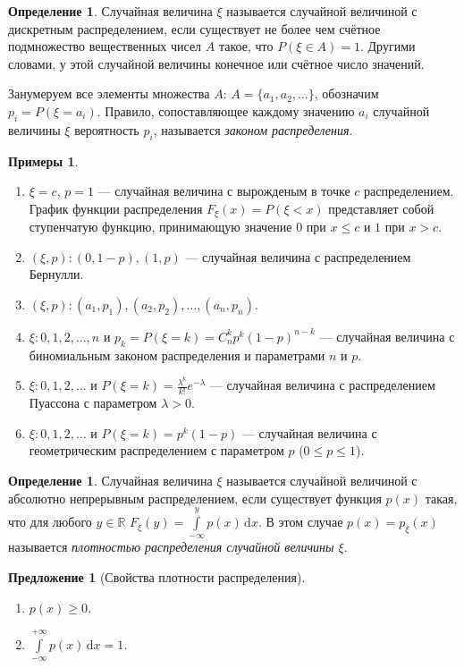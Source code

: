 \documentclass[11pt,openany,a4paper]{scrartcl}
\theoremstyle{plain}
\newtheorem{proposition}[theorem]{Предложение}
\theoremstyle{definition}
\newtheorem{definition}[theorem]{Определение}
\newtheorem{examples}[theorem]{Примеры}
\newcommand\mb{\mathbb}
\newcommand\real{\mb R}
\newcommand{\dif}{\, \mathrm d}
\newcommand{\funcdistr}{F_\xi}
\begin{document}
\begin{definition}
    Случайная величина $\xi$ называется случайной величиной с дискретным 
    распределением, если существует не более чем счётное подмножество
    вещественных чисел $A$ такое, что $P(\xi \in A) = 1$. Другими словами, у этой
    случайной величины конечное или счётное число значений.
\end{definition}

Занумеруем все элементы множества $A$: $A = \{a_1, a_2,\ldots\}$, обозначим
$p_i = P(\xi = a_i)$. Правило, сопоставляющее каждому значению $a_i$ случайной
величины $\xi$ вероятность $p_i$, называется \emph{законом распределения}.
\begin{examples}
    \begin{enumerate}
        \item $\xi = c$, $p = 1$ — случайная величина с вырожденым в точке
        $c$ распределением. График функции распределения $\funcdistr(x) =
        P(\xi < x)$ представляет собой ступенчатую функцию, принимающую
        значение $0$ при $x \leqslant c$ и $1$ при $x > c$.
        \item $(\xi, p): (0, 1-p), (1, p)$ — случайная величина с
        распределением Бернулли.
        \item $(\xi, p): (a_1, p_1), (a_2, p_2), \ldots, (a_n, p_n)$.
        \item $\xi: 0, 1, 2, \ldots, n$ и $p_k = P(\xi = k) = C_n^k p^k(1-p)^{n-k}$ 
        — случайная величина с биномиальным законом распределения и
        параметрами $n$ и $p$.
        \item $\xi: 0, 1, 2, \ldots$ и
        $P(\xi = k) = \frac{\lambda^k}{k!}e^{-\lambda}$ — случайная величина
        с распределением Пуассона с параметром $\lambda > 0$.
        \item $\xi: 0, 1, 2, \ldots$ и $P(\xi = k) = p^k(1-p)$ —
        случайная величина с геометрическим распределением с параметром
        $p$ ($0 \leqslant p \leqslant 1$).
    \end{enumerate}
\end{examples}
\begin{definition}
    Случайная величина $\xi$ называется случайной величиной с абсолютно 
    непрерывным распределением, если существует функция $p(x)$ такая, что
    для любого $y \in \real$ $F_\xi(y) = \int\limits_{-\infty}^y p(x) \dif x$.
    В этом случае $p(x) = p_\xi(x)$ называется \emph{плотностью распределения 
    случайной величины $\xi$}.
\end{definition}
\begin{proposition}[Свойства плотности распределения]
\mbox{}
    \begin{enumerate}
        \item $p(x) \geqslant 0$.
        \item $\int\limits_{-\infty}^{+\infty} p(x) \dif x = 1$.
    \end{enumerate}
\end{proposition}
\end{document}
